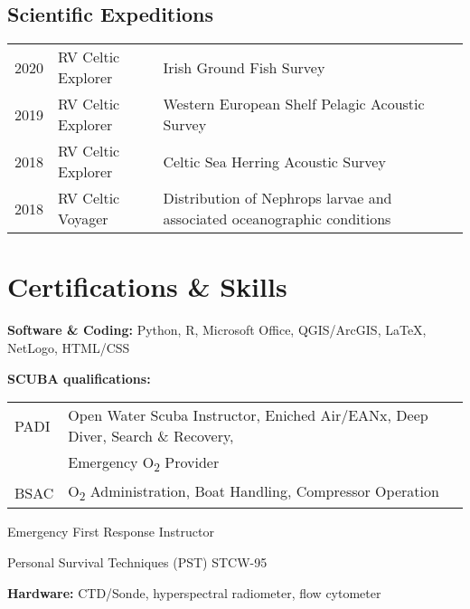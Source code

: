 \documentclass[a4paper]{deedy-resume} %
\begin{document}
\begin{flushleft}
\sectionspace %



\sectionspace %

\section{Scientific Expeditions}

\begin{tabular}{l l l}
2020 & RV Celtic Explorer & Irish Ground Fish Survey \\
2019 & RV Celtic Explorer & Western European Shelf Pelagic Acoustic Survey \\
2018 & RV Celtic Explorer & Celtic Sea Herring Acoustic Survey \\
2018 & RV Celtic Voyager & Distribution of Nephrops larvae and associated oceanographic conditions \\
\end{tabular}

\sectionspace %

\end{flushleft}



\section{Certifications \& Skills}
\sectionspace

\begin{tightitemize}
\item \textbf{Software \& Coding:} Python, R, Microsoft Office, QGIS/ArcGIS,  \LaTeX, NetLogo, HTML/CSS
\item \textbf{SCUBA qualifications:}  \\
\begin{tabular}{ l l }
PADI & Open Water Scuba Instructor, Eniched Air/EANx, Deep Diver, Search \& Recovery,  \\
 & Emergency O\textsubscript{2} Provider \\
BSAC & O\textsubscript{2} Administration, Boat Handling, Compressor Operation
\end{tabular}
\item Emergency First Response Instructor
\item Personal Survival Techniques (PST) STCW-95
\item \textbf{Hardware:} CTD/Sonde, hyperspectral radiometer, flow cytometer
\end{tightitemize}

\sectionspace %


\end{document}
